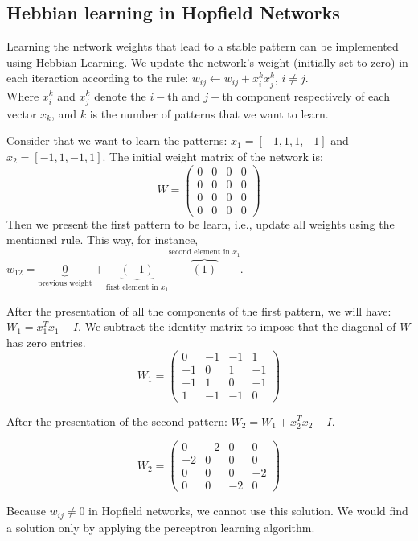 \documentclass[main]{subfiles}
\begin{document}
\subsection{Hebbian learning in Hopfield Networks}
Learning the network weights that lead to a stable pattern can be implemented using Hebbian Learning.
We update the network's weight (initially set to zero) in each iteraction according to the rule:
$w_{ij} \leftarrow w_{ij} + x_i^k x_j^k$, $i\neq j$.\\
Where $x_i^k$ and $x_j^k$ denote the $i-$th and $j-$th component respectively of each vector $x_k$, and $k$ is the number of patterns that we want to learn.

Consider that we want to learn the patterns: $x_1 = [ -1, 1, 1, -1]$ and $x_2 = [-1, 1, -1, 1]$.
The initial weight matrix of the network is:
\[
W = 
\begin{pmatrix}
0 & 0 & 0 & 0\\
0 & 0 & 0 & 0\\
0 & 0 & 0 & 0\\
0 & 0 & 0 & 0
\end{pmatrix}
\]
Then we present the first pattern to be learn, i.e., update all weights using the mentioned rule.
This way, for instance, $w_{12} = \underbrace{0}_{\text{previous weight}} + \underbrace{(-1)}_{\text{first element in $x_1$}}\overbrace{(1)}^{\text{second element in $x_1$}}$.

After the presentation of all the components of the first pattern, we will have: $W_1 = x_1^T x_1 - I$. We subtract the identity matrix to impose that the diagonal of $W$ has zero entries.
\[
W_1 = 
\begin{pmatrix}
0 & -1 & -1 & 1\\
-1 & 0 & 1 & -1\\
-1 & 1 & 0 & -1\\
1 & -1 & -1 & 0
\end{pmatrix}
\]

After the presentation of the second pattern: $W_2 = W_1 + x_2^T x_2 - I$.

\[
W_2 = 
\begin{pmatrix}
0 & -2 & 0 & 0\\
-2 & 0 & 0 & 0\\
0 & 0 & 0 & -2\\
0 & 0 & -2 & 0
\end{pmatrix}
\]

Because $w_{ij} \neq 0$ in Hopfield networks, we cannot use this solution. We would find a solution only by applying the perceptron learning algorithm.
\end{document}
